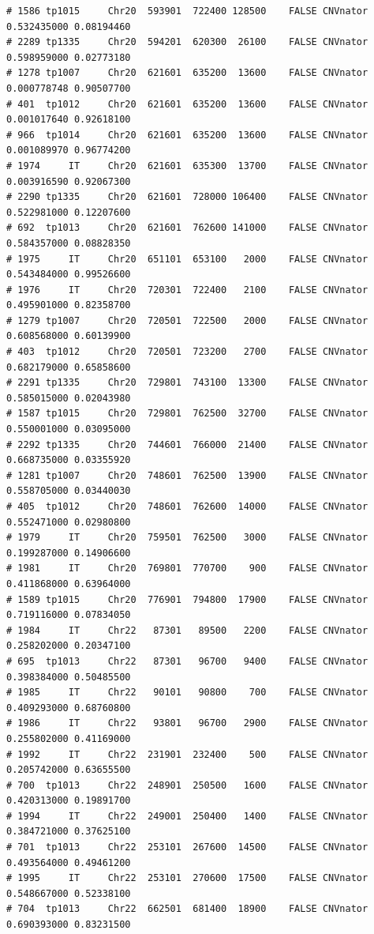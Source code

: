 \documentclass{article}\usepackage[]{graphicx}\usepackage[]{color}
\makeatletter
\newenvironment{kframe}{%
 \def\at@end@of@kframe{}%
 \ifinner\ifhmode%
  \def\at@end@of@kframe{\end{minipage}}%
  \begin{minipage}{\columnwidth}%
 \fi\fi%
 \def\FrameCommand##1{\hskip\@totalleftmargin \hskip-\fboxsep
 \colorbox{shadecolor}{##1}\hskip-\fboxsep
     \hskip-\linewidth \hskip-\@totalleftmargin \hskip\columnwidth}%
 \MakeFramed {\advance\hsize-\width
   \@totalleftmargin\z@ \linewidth\hsize
   \@setminipage}}%
 {\par\unskip\endMakeFramed%
 \at@end@of@kframe}
\newenvironment{knitrout}{}{} %
\makeatother
\begin{document}
\begin{knitrout}
\begin{kframe}
\begin{verbatim}
# 1586 tp1015     Chr20  593901  722400 128500    FALSE CNVnator 0.532435000 0.08194460
# 2289 tp1335     Chr20  594201  620300  26100    FALSE CNVnator 0.598959000 0.02773180
# 1278 tp1007     Chr20  621601  635200  13600    FALSE CNVnator 0.000778748 0.90507700
# 401  tp1012     Chr20  621601  635200  13600    FALSE CNVnator 0.001017640 0.92618100
# 966  tp1014     Chr20  621601  635200  13600    FALSE CNVnator 0.001089970 0.96774200
# 1974     IT     Chr20  621601  635300  13700    FALSE CNVnator 0.003916590 0.92067300
# 2290 tp1335     Chr20  621601  728000 106400    FALSE CNVnator 0.522981000 0.12207600
# 692  tp1013     Chr20  621601  762600 141000    FALSE CNVnator 0.584357000 0.08828350
# 1975     IT     Chr20  651101  653100   2000    FALSE CNVnator 0.543484000 0.99526600
# 1976     IT     Chr20  720301  722400   2100    FALSE CNVnator 0.495901000 0.82358700
# 1279 tp1007     Chr20  720501  722500   2000    FALSE CNVnator 0.608568000 0.60139900
# 403  tp1012     Chr20  720501  723200   2700    FALSE CNVnator 0.682179000 0.65858600
# 2291 tp1335     Chr20  729801  743100  13300    FALSE CNVnator 0.585015000 0.02043980
# 1587 tp1015     Chr20  729801  762500  32700    FALSE CNVnator 0.550001000 0.03095000
# 2292 tp1335     Chr20  744601  766000  21400    FALSE CNVnator 0.668735000 0.03355920
# 1281 tp1007     Chr20  748601  762500  13900    FALSE CNVnator 0.558705000 0.03440030
# 405  tp1012     Chr20  748601  762600  14000    FALSE CNVnator 0.552471000 0.02980800
# 1979     IT     Chr20  759501  762500   3000    FALSE CNVnator 0.199287000 0.14906600
# 1981     IT     Chr20  769801  770700    900    FALSE CNVnator 0.411868000 0.63964000
# 1589 tp1015     Chr20  776901  794800  17900    FALSE CNVnator 0.719116000 0.07834050
# 1984     IT     Chr22   87301   89500   2200    FALSE CNVnator 0.258202000 0.20347100
# 695  tp1013     Chr22   87301   96700   9400    FALSE CNVnator 0.398384000 0.50485500
# 1985     IT     Chr22   90101   90800    700    FALSE CNVnator 0.409293000 0.68760800
# 1986     IT     Chr22   93801   96700   2900    FALSE CNVnator 0.255802000 0.41169000
# 1992     IT     Chr22  231901  232400    500    FALSE CNVnator 0.205742000 0.63655500
# 700  tp1013     Chr22  248901  250500   1600    FALSE CNVnator 0.420313000 0.19891700
# 1994     IT     Chr22  249001  250400   1400    FALSE CNVnator 0.384721000 0.37625100
# 701  tp1013     Chr22  253101  267600  14500    FALSE CNVnator 0.493564000 0.49461200
# 1995     IT     Chr22  253101  270600  17500    FALSE CNVnator 0.548667000 0.52338100
# 704  tp1013     Chr22  662501  681400  18900    FALSE CNVnator 0.690393000 0.83231500

\end{verbatim}
\end{kframe}
\end{knitrout}
\end{document}
